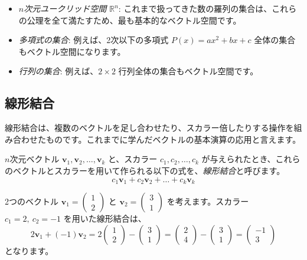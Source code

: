 \begin{ex}
\begin{itemize}
\item \emph{$n$次元ユークリッド空間 $\mathbb{R}^n$}: これまで扱ってきた数の羅列の集合は、これらの公理を全て満たすため、最も基本的なベクトル空間です。
\item \emph{多項式の集合}: 例えば、2次以下の多項式 $P(x) = ax^2 + bx + c$ 全体の集合もベクトル空間になります。
\item \emph{行列の集合}: 例えば、$2 \times 2$ 行列全体の集合もベクトル空間です。
\end{itemize}
\end{ex}

\subsection{線形結合}

線形結合は、複数のベクトルを足し合わせたり、スカラー倍したりする操作を組み合わせたものです。これまでに学んだベクトルの基本演算の応用と言えます。

\begin{dfn}[線形結合] \label{linear_combination}
$n$次元ベクトル $\bm{v}_1, \bm{v}_2, \ldots, \bm{v}_k$ と、スカラー $c_1, c_2, \ldots, c_k$ が与えられたとき、これらのベクトルとスカラーを用いて作られる以下の式を、\emph{線形結合}と呼びます。
\[c_1 \bm{v}_1 + c_2 \bm{v}_2 + \dots + c_k \bm{v}_k\]
\end{dfn}

\begin{ex}
2つのベクトル $\bm{v}_1 = \begin{pmatrix} 1 \\ 2 \end{pmatrix}$ と $\bm{v}_2 = \begin{pmatrix} 3 \\ 1 \end{pmatrix}$ を考えます。スカラー $c_1 = 2,\ c_2 = -1$ を用いた線形結合は、
\[2\bm{v}_1 + (-1)\bm{v}_2 = 2\begin{pmatrix} 1 \\ 2 \end{pmatrix} - \begin{pmatrix} 3 \\ 1 \end{pmatrix} = \begin{pmatrix} 2 \\ 4 \end{pmatrix} - \begin{pmatrix} 3 \\ 1 \end{pmatrix} = \begin{pmatrix} -1 \\ 3 \end{pmatrix}\]
となります。
\end{ex}

